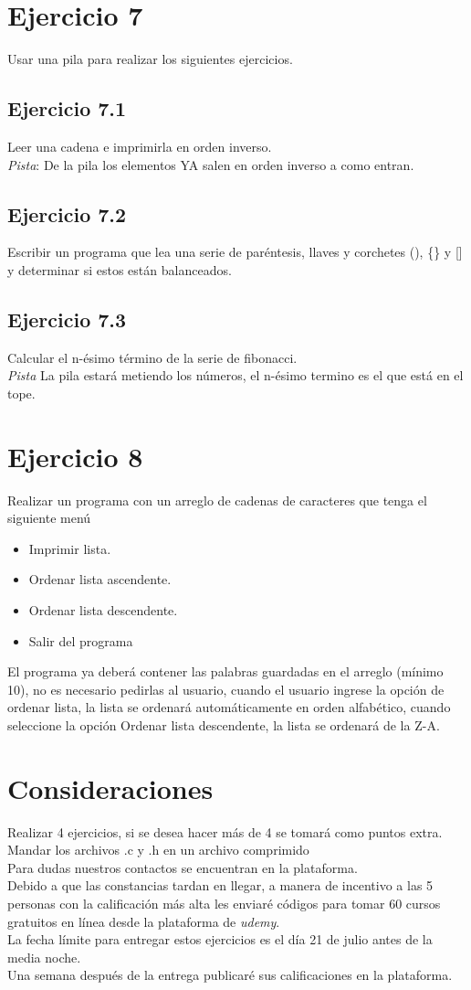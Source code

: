\documentclass{article}
\begin{document}
\section{\textbf{Ejercicio 7}}
Usar una pila para realizar los siguientes ejercicios.
\subsection{Ejercicio 7.1}
Leer una cadena e imprimirla en orden inverso.\\ \textit{Pista}: De la pila los elementos YA salen en orden inverso a como entran.
\subsection{Ejercicio 7.2}
Escribir un programa que lea una serie de paréntesis, llaves y corchetes (), \{\} y [] y determinar si estos están balanceados.
\subsection{Ejercicio 7.3}
Calcular el n-ésimo término de la serie de fibonacci.\\\textit{Pista} La pila estará metiendo los números, el n-ésimo termino es el que está en el tope.
\section{Ejercicio 8}
Realizar un programa con un arreglo de cadenas de caracteres que tenga el siguiente menú
\begin{itemize}
	\item Imprimir lista.
	\item Ordenar lista ascendente.
	\item Ordenar lista descendente.
	\item Salir del programa
\end{itemize}
El programa ya deberá contener las palabras guardadas en el arreglo (mínimo 10), no es necesario pedirlas al usuario, cuando el usuario ingrese la opción de ordenar lista, la lista se ordenará automáticamente en orden alfabético, cuando seleccione la opción Ordenar lista descendente, la lista se ordenará de la Z-A.
\section{Consideraciones}
Realizar 4 ejercicios, si se desea hacer más de 4 se tomará como puntos extra.\\Mandar los archivos .c y .h en un archivo comprimido\\Para dudas nuestros contactos se encuentran en la plataforma.\\ Debido a que las constancias tardan en llegar, a manera de incentivo a las 5 personas con la calificación más alta les enviaré códigos para tomar 60 cursos gratuitos en línea desde la plataforma de \textit{udemy}.\\La fecha límite para entregar estos ejercicios es el día 21 de julio antes de la media noche.\\Una semana después de la entrega publicaré sus calificaciones en la plataforma.
\end{document}
